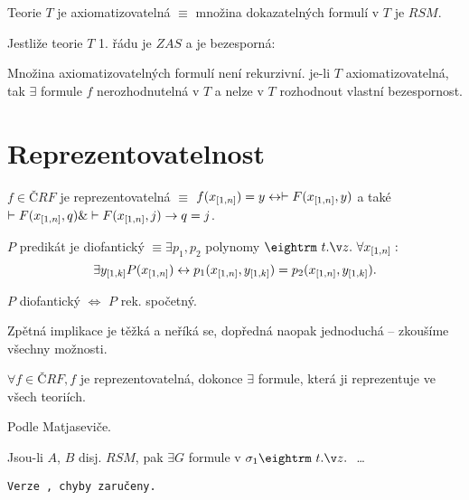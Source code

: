 \dfn Teorie $T$ je axiomatizovatelná $\equiv$ množina dokazatelných formulí v $T$ je $RSM$. 

 Jestliže teorie $T$ 1. řádu je $ZAS$ a je bezesporná:

\itemize\ibull
\: Množina axiomatizovatelných formulí není rekurzivní.
\: je-li $T$ axiomatizovatelná, tak $\exists$ formule $f$ nerozhodnutelná v $T$ a nelze v $T$ rozhodnout vlastní bezespornost.
\endlist

\section{Reprezentovatelnost}

\dfn $f \in ČRF$ je reprezentovatelná $\equiv$ $f(x_{[1,n]} ) = y \leftrightarrow \vdash F( x_{[1,n]} , y)$ a také
$\vdash F(x_{[1,n]} , q) \& \vdash F(x_{[1,n]} , j) \rightarrow q = j$.

\dfn $P$ predikát je diofantický $\equiv \exists p_1, p_2$ polynomy $\st \forall \mls x n :$
$$ \exists y_{[1,k]} P(x_{[1,n]} ) \leftrightarrow p_1(x_{[1,n]} , y_{[1,k]} ) = p_2(x_{[1,n]} , y_{[1,k]} ).$$

 $P$ diofantický $\iff$ $P$ rek. spočetný.

\prf{} Zpětná implikace je těžká a neříká se, dopředná naopak jednoduchá -- zkoušíme všechny možnosti.

\thm{} $\forall f \in ČRF, f$ je reprezentovatelná, dokonce $\exists$ formule, která ji reprezentuje ve všech teoriích.

\prf{} Podle Matjaseviče.

\res{}  Jsou-li $A$, $B$ disj. $RSM$, pak $\exists G$ formule v $\sigma_1 \st$ \dots

{\tt Verze \versionnumber, chyby zaručeny.} 
\bye
